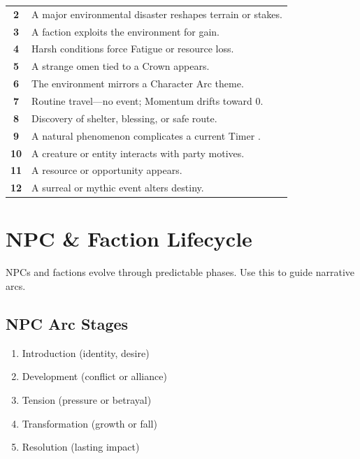 \documentclass[11pt]{article}
\begin{document}
\begin{center}
\begin{longtable}{|c|p{11cm}|}
\hline
\textbf{2} & A major environmental disaster reshapes terrain or stakes. \\
\textbf{3} & A faction exploits the environment for gain. \\
\textbf{4} & Harsh conditions force Fatigue or resource loss. \\
\textbf{5} & A strange omen tied to a Crown appears. \\
\textbf{6} & The environment mirrors a Character Arc theme. \\
\textbf{7} & Routine travel---no event; Momentum drifts toward 0. \\
\textbf{8} & Discovery of shelter, blessing, or safe route. \\
\textbf{9} & A natural phenomenon complicates a current Timer . \\
\textbf{10} & A creature or entity interacts with party motives. \\
\textbf{11} & A resource or opportunity appears. \\
\textbf{12} & A surreal or mythic event alters destiny. \\
\hline
\end{longtable}
\end{center}


\section{NPC \& Faction Lifecycle}
\label{appendix:lifecycle}

NPCs and factions evolve through predictable phases. Use this to guide narrative arcs.

\subsection{NPC Arc Stages}

\begin{enumerate}
    \item Introduction (identity, desire)
    \item Development (conflict or alliance)
    \item Tension (pressure or betrayal)
    \item Transformation (growth or fall)
    \item Resolution (lasting impact)
\end{enumerate}
\end{document}

